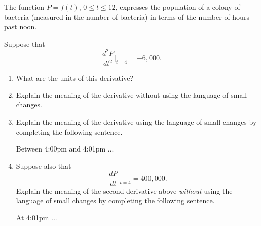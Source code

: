 \documentclass{ximera}
\begin{document}
\begin{question} \label{Q9dfgnmnmcxcv}
The function $P=f(t)$, $0\leq t \leq 12$, expresses the population of a colony of bacteria (measured in the number of bacteria) in terms of the number of hours past noon.

Suppose that
\begin{equation}
   \frac{d^2 P}{dt^2} \Big|_{t=4} =  -6,000 .  %
\end{equation}


\begin{enumerate}
\item What are the units of this derivative?

\item Explain the meaning of the derivative without using the language of small changes.

\item Explain the meaning of the derivative using the language of small changes by completing the following sentence.

Between 4:00pm and 4:01pm  ...

\item Suppose also that
\[
   \frac{dP}{dt}\Big|_{t=4} = 400,000 .
\]
Explain the meaning of the second derivative above \emph{without} using the language of small changes by completing the following sentence.

At 4:01pm  ...

\end{enumerate}
\end{question}
\end{document}
